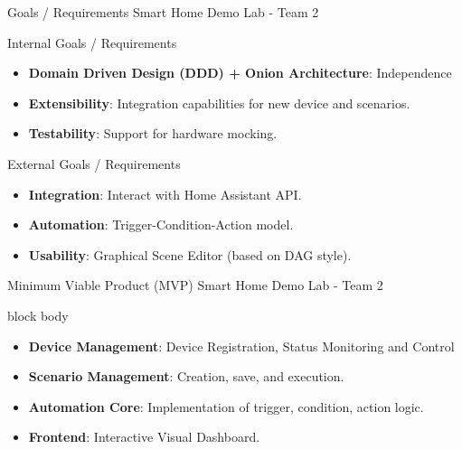 \documentclass[aspectratio=169, 10pt, xcolor=table]{beamer}
\begin{document}
\begin{frame}{Goals / Requirements}
    {Smart Home Demo Lab - Team 2}
    
    \begin{block}{Internal Goals / Requirements}
        \begin{itemize}[<+->]
            \item \textbf{Domain Driven Design (DDD) + Onion Architecture}: Independence
            \item \textbf{Extensibility}: Integration capabilities for new device and scenarios.
            \item \textbf{Testability}: Support for hardware mocking.
        \end{itemize}
    \end{block}

    \pause

    \begin{block}{External Goals / Requirements}
        \begin{itemize}[<+->]
            \item \textbf{Integration}: Interact with Home Assistant API.
            \item \textbf{Automation}: Trigger-Condition-Action model.
            \item \textbf{Usability}: Graphical Scene Editor (based on DAG style).
        \end{itemize}
    \end{block}
\end{frame}

\begin{frame}{Minimum Viable Product (MVP)}
    {Smart Home Demo Lab - Team 2}
    
    \centering
    \begin{beamercolorbox}[sep=1em, rounded=true, shadow=true, wd=0.95\textwidth, center]{block body}
        \begin{itemize}[<+->]
            \setlength\itemsep{0.8em}
            \item \textbf{Device Management}: Device Registration, Status Monitoring and Control
            \item \textbf{Scenario Management}: Creation, save, and execution.
            \item \textbf{Automation Core}: Implementation of trigger, condition, action logic.
            \item \textbf{Frontend}: Interactive Visual Dashboard.
        \end{itemize}
    \end{beamercolorbox}
\end{frame}
\end{document}

